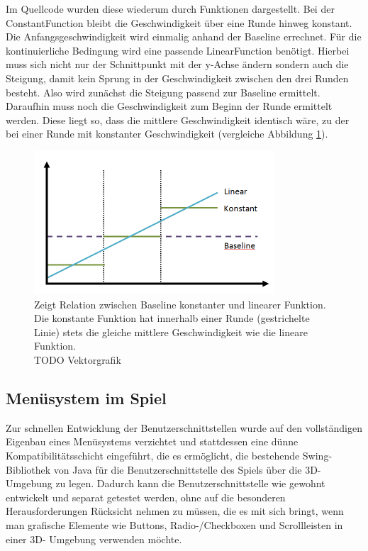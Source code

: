\documentclass[a4paper,12pt]{scrartcl}
\begin{document}
Im Quellcode wurden diese wiederum durch Funktionen dargestellt. Bei der
ConstantFunction bleibt die Geschwindigkeit über eine Runde hinweg konstant.
Die Anfangsgeschwindigkeit wird einmalig anhand der Baseline errechnet. Für die
kontinuierliche Bedingung wird eine passende LinearFunction benötigt. Hierbei muss
sich nicht nur der Schnittpunkt mit der y-Achse ändern sondern auch die Steigung,
damit kein Sprung in der Geschwindigkeit zwischen den drei Runden besteht. Also
wird zunächst die Steigung passend zur Baseline ermittelt. Daraufhin muss noch
die Geschwindigkeit zum Beginn der Runde ermittelt werden. Diese liegt so, dass
die mittlere Geschwindigkeit identisch wäre, zu der bei einer Runde mit konstanter
Geschwindigkeit (vergleiche Abbildung \ref{fig:SessionTypen}).

\begin{figure}[htp]
\begin{center}
  \includegraphics[width=0.8\textwidth]{SessionTypen.png}
  \caption[Vergleich der Geschwindigkeitsfunktionen]{Zeigt Relation zwischen
  Baseline konstanter und linearer Funktion. Die konstante Funktion hat innerhalb einer Runde (gestrichelte Linie) stets die gleiche
mittlere Geschwindigkeit wie die lineare Funktion.\\
  TODO Vektorgrafik}
  \label{fig:SessionTypen}
\end{center}
\end{figure} 

\subsection{Menüsystem im Spiel}
Zur schnellen Entwicklung der Benutzerschnittstellen wurde auf den
vollständigen Eigenbau eines Menüsystems verzichtet und stattdessen eine dünne Kompatibilitätsschicht
eingeführt, die es ermöglicht, die bestehende Swing-Bibliothek von Java für die
Benutzerschnittstelle des Spiels über die 3D-Umgebung zu legen. Dadurch kann die
Benutzerschnittstelle wie gewohnt entwickelt und separat getestet werden, ohne auf die
besonderen Herausforderungen Rücksicht nehmen zu müssen, die es mit sich bringt, wenn
man grafische Elemente wie Buttons, Radio-/Checkboxen und Scrollleisten in einer 3D-
Umgebung verwenden möchte.
\end{document}
